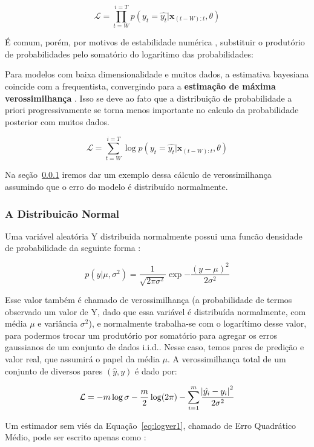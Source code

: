 \[
\mathcal{L} = \prod_{t=W}^{i=T} p(y_t=\hat{y_t} | \textbf{x}_{(t-W):t}, \theta) 
\]

É comum, porém, por motivos de estabilidade numérica \citep{dlbook}, substituir
o produtório de probabilidades pelo somatório do logarítimo das probabilidades: 

Para modelos com baixa dimensionalidade e muitos dados, a estimativa bayesiana
coincide com a frequentista, convergindo para a \textbf{estimação de máxima
verossimilhança} \citep{mlprob}. Isso se deve ao fato que a distribuição de
probabilidade a priori progressivamente se torna menos importante no calculo da
probabilidade posterior com muitos dados.


\[
  \mathcal{L} = \sum_{t=W}^{i=T} \log{p(y_t=\hat{y_t} | \textbf{x}_{(t-W):t},\theta)}
\]


Na seção~\ref{sec:reglog} iremos dar um exemplo dessa cálculo de verossimilhança
assumindo que o erro do modelo é distribuído normalmente.

\subsubsection{A Distribuicão Normal}
\label{sec:reglog}

Uma variável aleatória Y distribuida normalmente possui uma funcão densidade de
probabilidade da seguinte forma \citep{mlprob}:

\begin{equation}
  \label{eq:ver}
p(y| \mu,\sigma^2) = \frac{1}{\sqrt{2\pi\sigma^2}}\exp{-\frac{(y - \mu)^2}{2\sigma^2}}
\end{equation}

Esse valor também é chamado de verossimilhança (a probabilidade de termos
observado um valor de Y, dado que essa variável é distribuída normalmente, com média $\mu$ e variância $\sigma^2$), e
normalmente trabalha-se com o logarítimo desse valor, para podermos trocar um
produtório por somatório para agregar os erros gaussianos de um conjunto de dados
i.i.d.. Nesse caso, temos pares de predição e valor real, que assumirá o papel
da média $\mu$. A verossimilhança total de um conjunto de diversos pares
$(\hat{y},y)$ é dado por: 

\begin{equation}
\label{eq:logver1}
  \mathcal{L}= -m \log \sigma - \frac{m}{2} \log (2 \pi) - \sum^m_{i=1}
  \frac{\abs{\hat{y_i}-y_i}^2}{2 \sigma^2}
\end{equation}

Um estimador sem viés da Equação~\ref{eq:logver1}, chamado de Erro Quadrático
Médio, pode ser escrito apenas como \citep{mlprob}:

